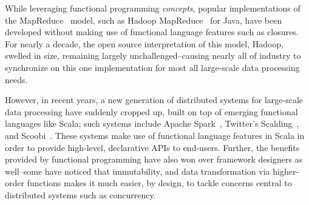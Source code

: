 \documentclass{jfp1}
\newcommand{\fixme}[1]{{\color{gray}\itshape#1}}
\begin{document}
While leveraging functional programming {\em concepts}, popular implementations
of the MapReduce~\cite{MapReduce} model, such as Hadoop MapReduce~\cite{Hadoop}
for Java, have been developed without making use of functional language features
such as closures. For nearly a decade, the open source interpretation of this
model, Hadoop, swelled in size, remaining largely unchallenged--causing nearly
all of industry to synchronize on this one implementation for most all
large-scale data processing needs.

However, in recent years, a new generation of distributed systems for
large-scale data processing have suddenly cropped up, built on top of emerging
functional languages like Scala; such systems include Apache Spark~\cite{Spark},
Twitter's Scalding~\cite{Scalding}, and Scoobi~\cite{Scoobi}. These systems make
use of functional language features in Scala in order to provide high-level,
declarative APIs to end-users. Further, the benefits provided by functional
programming have also won over framework designers as well--some have noticed
that immutability, and data transformation via higher-order functions makes it
much easier, by design, to tackle concerns central to distributed systems such
as concurrency.




%
%
%
%
\end{document}
